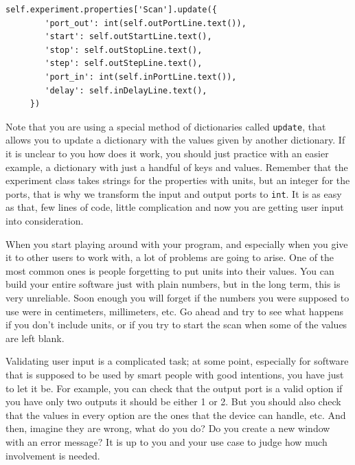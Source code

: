 \begin{verbatim}
self.experiment.properties['Scan'].update({
        'port_out': int(self.outPortLine.text()),
        'start': self.outStartLine.text(),
        'stop': self.outStopLine.text(),
        'step': self.outStepLine.text(),
        'port_in': int(self.inPortLine.text()),
        'delay': self.inDelayLine.text(),
     })
\end{verbatim}

Note that you are using a special method of dictionaries called
\texttt{update}, that allows you to update a dictionary with the values
given by another dictionary. If it is unclear to you how does it work,
you should just practice with an easier example, a dictionary with just
a handful of keys and values. Remember that the experiment class takes
strings for the properties with units, but an integer for the ports,
that is why we transform the input and output ports to \texttt{int}. It
is as easy as that, few lines of code, little complication and now you
are getting user input into consideration.

When you start playing around with your program, and especially when you
give it to other users to work with, a lot of problems are going to
arise. One of the most common ones is people forgetting to put units
into their values. You can build your entire software just with plain
numbers, but in the long term, this is very unreliable. Soon enough you
will forget if the numbers you were supposed to use were in centimeters,
millimeters, etc. Go ahead and try to see what happens if you don't
include units, or if you try to start the scan when some of the values
are left blank.

Validating user input is a complicated task; at some point, especially
for software that is supposed to be used by smart people with good
intentions, you have just to let it be. For example, you can check that
the output port is a valid option if you have only two outputs it should
be either 1 or 2. But you should also check that the values in every
option are the ones that the device can handle, etc. And then, imagine
they are wrong, what do you do? Do you create a new window with an error
message? It is up to you and your use case to judge how much involvement
is needed.


